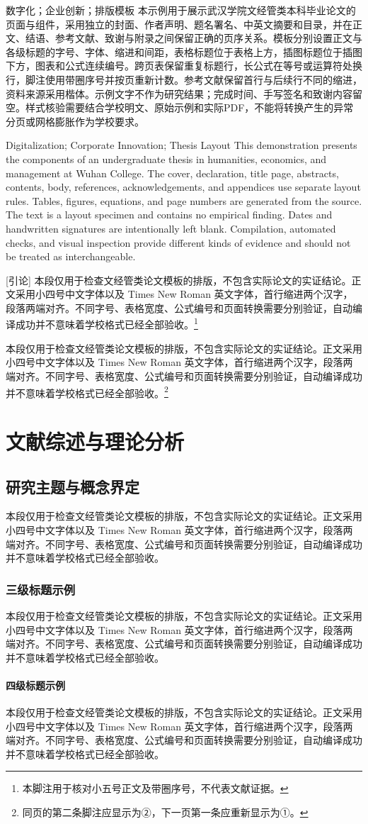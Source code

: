\documentclass{whcthesis}
\newcommand\demopar{本段仅用于检查文经管类论文模板的排版，不包含实际论文的实证结论。正文采用小四号中文字体以及 Times New Roman 英文字体，首行缩进两个汉字，段落两端对齐。不同字号、表格宽度、公式编号和页面转换需要分别验证，自动编译成功并不意味着学校格式已经全部验收。}
\begin{document}
\WhcMakeCover
\WhcMakeDeclaration
\WhcMakeTitlePage
\begin{whcabstract}[cn]{数字化；企业创新；排版模板}
本示例用于展示武汉学院文经管类本科毕业论文的页面与组件，采用独立的封面、作者声明、题名署名、中英文摘要和目录，并在正文、结语、参考文献、致谢与附录之间保留正确的页序关系。模板分别设置正文与各级标题的字号、字体、缩进和间距，表格标题位于表格上方，插图标题位于插图下方，图表和公式连续编号。跨页表保留重复标题行，长公式在等号或运算符处换行，脚注使用带圈序号并按页重新计数。参考文献保留首行与后续行不同的缩进，资料来源采用楷体。示例文字不作为研究结果；完成时间、手写签名和致谢内容留空。样式核验需要结合学校明文、原始示例和实际PDF，不能将转换产生的异常分页或网格膨胀作为学校要求。
\end{whcabstract}
\begin{whcabstract}[en]{Digitalization; Corporate Innovation; Thesis Layout}
This demonstration presents the components of an undergraduate thesis in humanities, economics, and management at Wuhan College. The cover, declaration, title page, abstracts, contents, body, references, acknowledgements, and appendices use separate layout rules. Tables, figures, equations, and page numbers are generated from the source. The text is a layout specimen and contains no empirical finding. Dates and handwritten signatures are intentionally left blank. Compilation, automated checks, and visual inspection provide different kinds of evidence and should not be treated as interchangeable.
\end{whcabstract}
\WhcTableOfContents
\WhcMainMatter
{}[引论]
\demopar\footnote{本脚注用于核对小五号正文及带圈序号，不代表文献证据。}\par
\demopar\footnote{同页的第二条脚注应显示为②，下一页第一条应重新显示为①。}\par
\section{文献综述与理论分析}
\subsection{研究主题与概念界定}
\demopar
\subsubsection{三级标题示例}
\demopar
\paragraph{四级标题示例}
\demopar
\end{document}
